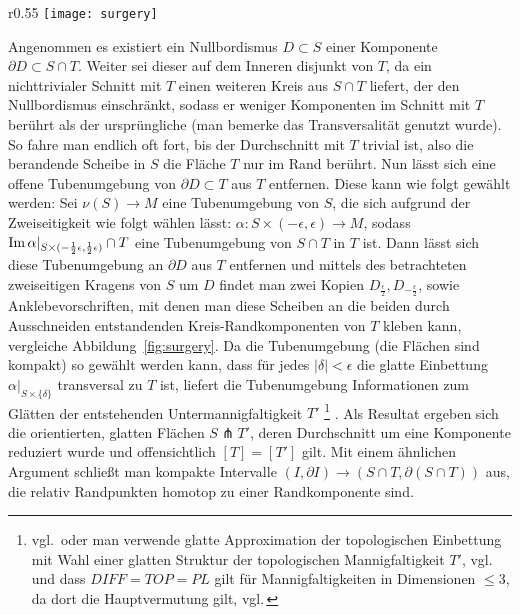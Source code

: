                         \begin{wrapfigure}{r}{0.55\textwidth}
                \centering
                \texttt{[image: surgery]}
                \caption{Ausschneiden einer Umgebung von $S\cap T$ und Ankleben zweier Scheiben, sodass die Homologieklasse erhalten bleibt}
                \label{fig:surgery}
            \end{wrapfigure} 
            Angenommen es existiert ein Nullbordismus $D\subset S$ einer Komponente $\partial D \subset S \cap T$. Weiter sei dieser auf dem Inneren disjunkt von $T$, da ein nichttrivialer Schnitt mit $T$ einen weiteren Kreis aus $S\cap T$ liefert, der den Nullbordismus einschränkt, sodass er weniger Komponenten im Schnitt mit $T$ berührt als der ursprüngliche (man bemerke das Transversalität genutzt wurde). So fahre man endlich oft fort, bis der Durchschnitt mit $T$ trivial ist, also die berandende Scheibe in $S$ die Fläche $T$ nur im Rand berührt.
            Nun lässt sich eine offene Tubenumgebung von $\partial D \subset T$ aus $T$ entfernen.
			Diese kann wie folgt gewählt werden: Sei $\nu(S) \to M$ eine Tubenumgebung von $S$, die sich aufgrund der Zweiseitigkeit wie folgt wählen lässt: $\alpha: S \times (-\epsilon,\epsilon) \to M$, sodass $\operatorname{Im}\alpha|_{S\times (-\frac 12\epsilon,\frac 12 \epsilon)} \cap T$ eine Tubenumgebung von $S\cap T $ in $ T$ ist. Dann lässt sich diese Tubenumgebung an $\partial D$ aus $T$ entfernen und mittels des betrachteten zweiseitigen Kragens von $S$ um $D$ findet man zwei Kopien $D_{\frac \epsilon 2}, D_{-\frac \epsilon 2}$, sowie Anklebevorschriften, mit denen man diese Scheiben an die beiden durch Ausschneiden entstandenden Kreis-Randkomponenten von $T$ kleben kann, vergleiche Abbildung~\ref{fig:surgery}. Da die Tubenumgebung (die Flächen sind kompakt) so gewählt werden kann, dass für jedes $|\delta|<\epsilon$ die glatte Einbettung $\alpha|_{S \times \{\delta\}}$ transversal zu $T$ ist, liefert die Tubenumgebung Informationen zum Glätten der entstehenden Untermannigfaltigkeit $T'$ \footnote{vgl.\,\cite{WhiteheadJ.H.C..1961} oder man verwende glatte Approximation der topologischen Einbettung mit Wahl einer glatten Struktur der topologischen Mannigfaltigkeit $T'$, vgl.\,\cite[Chapter 5, Lemma 1.5]{Hirsch.1991} und dass $DIFF=TOP=PL$ gilt für Mannigfaltigkeiten in Dimensionen $\le 3$, da dort die Hauptvermutung gilt, vgl.\,\cite[Chapter 35,36]{Moise.1977}} . Als Resultat ergeben sich die orientierten, glatten Flächen $S \pitchfork T'$, deren Durchschnitt um eine Komponente reduziert wurde und offensichtlich $[T]=[T']$ gilt. Mit einem ähnlichen Argument schließt man kompakte Intervalle $(I,\partial I) \to (S\cap T, \partial(S\cap T))$ aus, die relativ Randpunkten homotop zu einer Randkomponente sind. 

